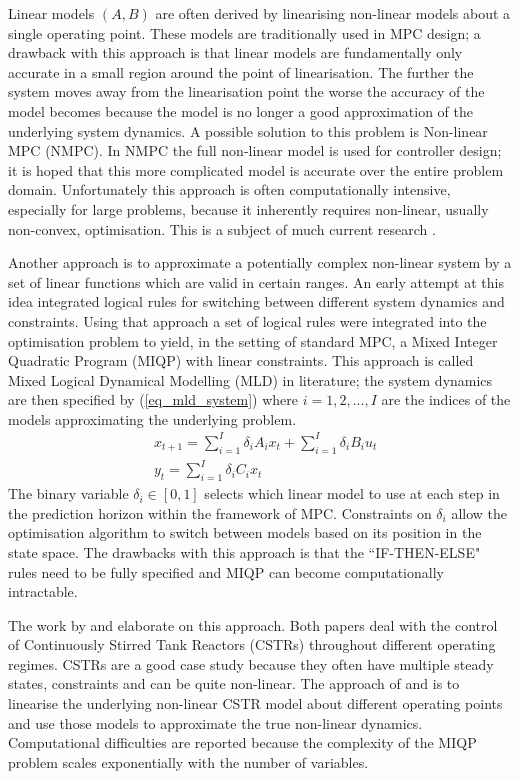 Linear models $(A, B)$ are often derived by linearising non-linear models about a single operating point. These models are traditionally used in MPC design; a drawback with this approach is that linear models are fundamentally only accurate in a small region around the point of linearisation. The further the system moves away from the linearisation point the worse the accuracy of the model becomes because the model is no longer a good approximation of the underlying system dynamics. A possible solution to this problem is Non-linear MPC (NMPC). In NMPC the full non-linear model is used for controller design; it is hoped that this more complicated model is accurate over the entire problem domain. Unfortunately this approach is often computationally intensive, especially for large problems, because it inherently requires non-linear, usually non-convex, optimisation. This is a subject of much current research \cite{diehl}. 

Another approach is to approximate a potentially complex non-linear system by a set of linear functions which are valid in certain ranges. An early attempt at this idea \cite{bemporad} integrated logical rules for switching between different system dynamics and constraints. Using that approach a set of logical rules were integrated into the optimisation problem to yield, in the setting of standard MPC, a Mixed Integer Quadratic Program (MIQP) with linear constraints. This approach is called Mixed Logical Dynamical Modelling (MLD) in literature; the system dynamics are then specified by (\ref{eq_mld_system}) where $i=1,2,..., I$ are the indices of the models approximating the underlying problem.
\begin{equation}
\begin{aligned}
&x_{t+1} = \sum_{i=1}^I \delta_i A_i x_t + \sum_{i=1}^I \delta_i B_i u_t \\
&y_t = \sum_{i=1}^I \delta_i C_i x_t 
\end{aligned}
\label{eq_mld_system}
\end{equation}
The binary variable $\delta_i \in [0, 1]$ selects which linear model to use at each step in the prediction horizon within the framework of MPC. Constraints on $\delta_i$ allow the optimisation algorithm to switch between models based on its position in the state space.  The drawbacks with this approach is that the ``IF-THEN-ELSE" rules need to be fully specified and MIQP can become computationally intractable. 

The work by \cite{du} and \cite{sakakura} elaborate on this approach. Both papers deal with the control of Continuously Stirred Tank Reactors (CSTRs) throughout different operating regimes. CSTRs are a good case study because they often have multiple steady states, constraints and can be quite non-linear. The approach of \cite{du} and \cite{sakakura} is to linearise the underlying non-linear CSTR model about different operating points and use those models to approximate the true non-linear dynamics. Computational difficulties are reported because the complexity of the MIQP problem scales exponentially with the number of variables.

